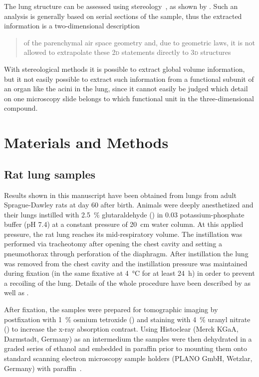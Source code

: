 \documentclass[%
	paper=a4,%
	abstract=true,%
	]{scrartcl}
\newcommand{\twod}{2\textsc{d}\xspace}
\newcommand{\threed}{3\textsc{d}\xspace}
\begin{document}
The lung structure can be assessed using stereology~\cite{Hsia2010}, as shown by \citet{Tschanz2002}. Such an analysis is generally based on serial sections of the sample, thus the extracted information is a two-dimensional description \blockquote[\cite{Tschanz2002}]{of the parenchymal air space geometry and, due to geometric laws, it is not allowed to extrapolate these \twod statements directly to \threed structures}. With stereological methods it is possible to extract global volume information, but it not easily possible to extract such information from a functional subunit of an organ like the acini in the lung, since it cannot easily be judged which detail on one microscopy slide belongs to which functional unit in the three-dimensional compound.

\section{Materials and Methods\label{sec:MM}}
\subsection{Rat lung samples}
Results shown in this manuscript have been obtained from lungs from adult Sprague-Dawley rats at day 60 after birth. Animals were deeply anesthetized and their lungs instilled with \SI{2.5}{\percent} glutaraldehyde () in \SI{0.03}{\Molar} potassium-phosphate buffer (pH 7.4) at a constant pressure of \SI{20}{\centi\meter} water column. At this applied pressure, the rat lung reaches its mid-respiratory volume. The instillation was performed via tracheotomy after opening the chest cavity and setting a pneumothorax through perforation of the diaphragm. After instillation the lung was removed from the chest cavity and the instillation pressure was maintained during fixation (in the same fixative at \SI{4}{\celsius} for at least \SI{24}{\hour}) in order to prevent a recoiling of the lung. Details of the whole procedure have been described by \citet{Tschanz2002} as well as \citet{Burri1974}.

After fixation, the samples were prepared for tomographic imaging by postfixation with \SI{1}{\percent} osmium tetroxide () and staining with \SI{4}{\percent} uranyl nitrate () to increase the x-ray absorption contrast. Using Histoclear (Merck KGaA, Darmstadt, Germany) as an intermedium the samples were then dehydrated in a graded series of ethanol and embedded in paraffin prior to mounting them onto standard scanning electron microscopy sample holders (PLANO GmbH, Wetzlar, Germany) with paraffin~\cite{Tsuda2008}.
\end{document}
